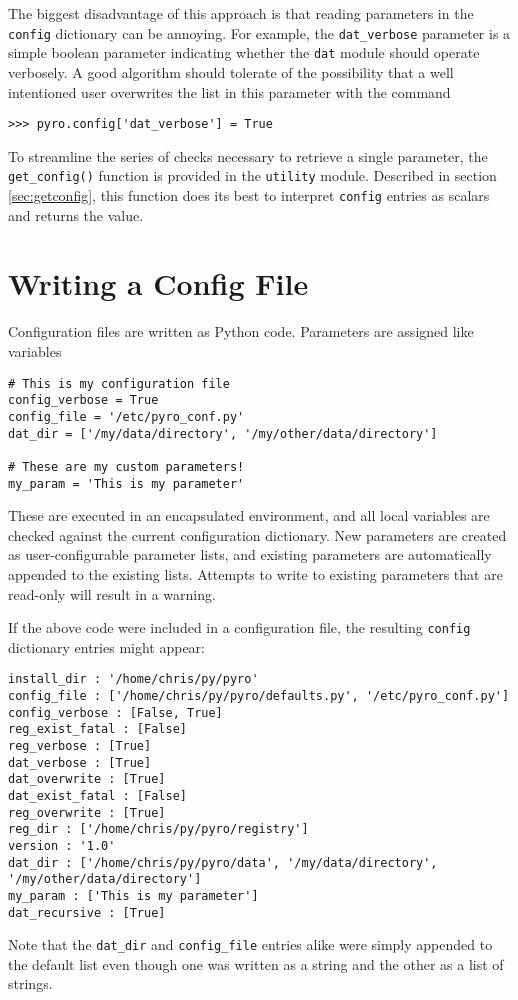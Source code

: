 The biggest disadvantage of this approach is that reading parameters in the \verb|config| dictionary can be annoying.  For example, the \verb|dat_verbose| parameter is a simple boolean parameter indicating whether the \verb|dat| module should operate verbosely.  A good algorithm should tolerate of the possibility that a well intentioned user overwrites the list in this parameter with the command
\begin{verbatim}
>>> pyro.config['dat_verbose'] = True
\end{verbatim}

To streamline the series of checks necessary to retrieve a single parameter, the \verb|get_config()| function is provided in the \verb|utility| module.  Described in section \ref{sec:getconfig}, this function does its best to interpret \verb|config| entries as scalars and returns the value.

\section{Writing a Config File}
Configuration files are written as Python code.  Parameters are assigned like variables
\begin{verbatim}
# This is my configuration file
config_verbose = True
config_file = '/etc/pyro_conf.py'
dat_dir = ['/my/data/directory', '/my/other/data/directory']

# These are my custom parameters!
my_param = 'This is my parameter'
\end{verbatim}

These are executed in an encapsulated environment, and all local variables are checked against the current configuration dictionary.  New parameters are created as user-configurable parameter lists, and existing parameters are automatically appended to the existing lists.  Attempts to write to existing parameters that are read-only will result in a warning.

If the above code were included in a configuration file, the resulting \verb|config| dictionary entries might appear:
\begin{verbatim}
install_dir : '/home/chris/py/pyro'
config_file : ['/home/chris/py/pyro/defaults.py', '/etc/pyro_conf.py']
config_verbose : [False, True]
reg_exist_fatal : [False]
reg_verbose : [True]
dat_verbose : [True]
dat_overwrite : [True]
dat_exist_fatal : [False]
reg_overwrite : [True]
reg_dir : ['/home/chris/py/pyro/registry']
version : '1.0'
dat_dir : ['/home/chris/py/pyro/data', '/my/data/directory', '/my/other/data/directory']
my_param : ['This is my parameter']
dat_recursive : [True]
\end{verbatim}
Note that the \verb|dat_dir| and \verb|config_file| entries alike were simply appended to the default list even though one was written as a string and the other as a list of strings.

